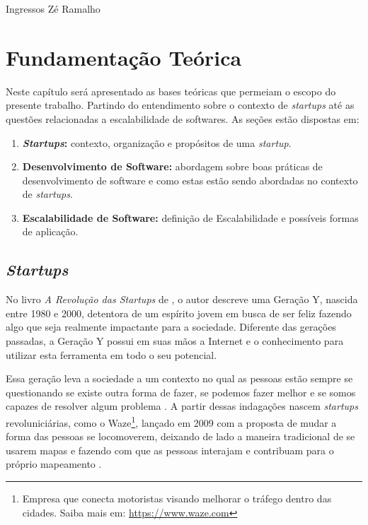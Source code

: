 Ingressos Zé Ramalho\chapter[Fundamentação Teórica]{Fundamentação Teórica}

Neste capítulo será apresentado as bases teóricas que permeiam o escopo
do presente trabalho. Partindo do entendimento sobre o contexto de
\textit{startups} até as questões relacionadas a escalabilidade de softwares.
As seções estão dispostas em:

  \begin{enumerate}
    \item \textbf{\textit{Startups}:} contexto, organização e propósitos de uma 
      \textit{startup}.
    \item \textbf{Desenvolvimento de Software:} abordagem sobre boas práticas
    de desenvolvimento de software e como estas estão sendo abordadas no contexto
    de \textit{startups}.
    \item \textbf{Escalabilidade de Software:} definição de Escalabilidade e 
      possíveis formas de aplicação.
  \end{enumerate}

\section{\textit{Startups}}

No livro \textit{A Revolução das Startups} de ,
o autor descreve uma Geração Y, nascida entre 1980 e 2000, detentora de um
espírito jovem em busca de ser feliz fazendo algo que seja realmente
impactante para a sociedade. Diferente das gerações passadas, a Geração Y
possui em suas mãos a Internet e o conhecimento para utilizar esta
ferramenta em todo o seu potencial.

Essa geração leva a sociedade a um contexto no qual as pessoas estão sempre
se questionando se existe outra forma de fazer, se podemos fazer melhor e
se somos capazes de resolver algum problema \cite{ARevolucaoDasStartups}.
A partir dessas indagações nascem \textit{startups} revoluniciárias, como
o Waze\footnote{Empresa que conecta motoristas visando melhorar o tráfego
dentro das cidades. Saiba mais em: \url{https://www.waze.com}}, lançado em
2009 com a proposta de mudar a forma das pessoas se locomoverem, deixando 
de lado a maneira tradicional de se usarem mapas e fazendo com que as 
pessoas interajam e contribuam para o próprio mapeamento
\cite{NepomucenoSucessoDoWaze}.

